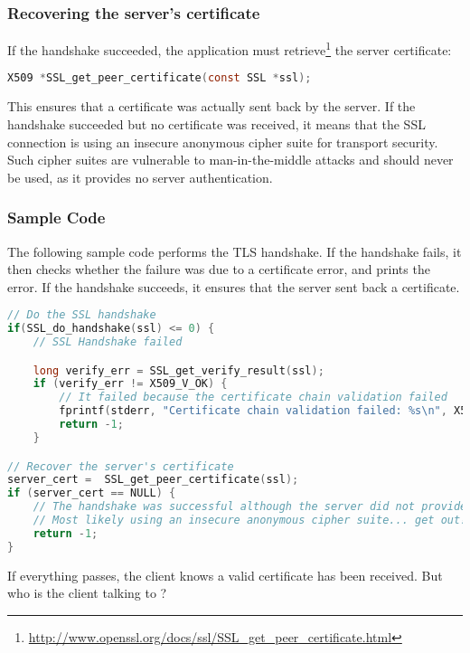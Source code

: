 \documentclass{article}
\begin{document}
\subsubsection{Recovering the server's certificate} 

If the handshake succeeded, the application must 
retrieve\footnote{\url{http://www.openssl.org/docs/ssl/SSL_get_peer_certificate.html}}
the server certificate:

\begin{lstlisting}[style=code,language=C,numbers=none,caption={}]
X509 *SSL_get_peer_certificate(const SSL *ssl);
\end{lstlisting}

This ensures that a certificate was actually sent back by the server. If the
handshake succeeded but no certificate was received, it means that the SSL
connection is using an insecure anonymous cipher suite for transport security.
Such cipher suites are vulnerable to man-in-the-middle attacks and should never 
be used, as it provides no server authentication.

\subsubsection{Sample Code}

The following sample code performs the TLS handshake. If the handshake fails,
it then checks whether the failure was due to a certificate error, and prints
the error. If the handshake succeeds, it ensures that the server sent back 
a certificate.

\begin{lstlisting}[style=code,language=C,numbers=none,caption={}]
// Do the SSL handshake
if(SSL_do_handshake(ssl) <= 0) {
	// SSL Handshake failed

	long verify_err = SSL_get_verify_result(ssl);
	if (verify_err != X509_V_OK) { 
		// It failed because the certificate chain validation failed
		fprintf(stderr, "Certificate chain validation failed: %s\n", X509_verify_cert_error_string(verify_err));
		return -1;
	}

// Recover the server's certificate
server_cert =  SSL_get_peer_certificate(ssl);
if (server_cert == NULL) {
	// The handshake was successful although the server did not provide a certificate
	// Most likely using an insecure anonymous cipher suite... get out!
	return -1;
}
\end{lstlisting}

If everything passes, the client knows a valid certificate has been received.
But who is the client talking to ?
\end{document}

